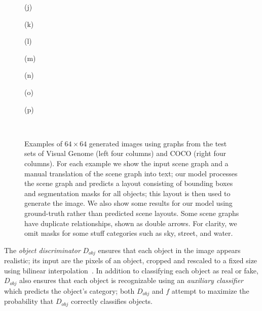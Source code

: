 \documentclass[10pt,twocolumn,letterpaper]{article}
\begin{document}
\begin{figure*}[ht!]
  \begin{minipage}{\qualsize} \centering\scriptsize (j) \end{minipage}
  \begin{minipage}{\qualsize} \centering\scriptsize (k) \end{minipage}
  \begin{minipage}{\qualsize} \centering\scriptsize (l) \end{minipage}
  \begin{minipage}{\qualsize} \centering\scriptsize (m) \end{minipage}
  \begin{minipage}{\qualsize} \centering\scriptsize (n) \end{minipage}
  \begin{minipage}{\qualsize} \centering\scriptsize (o) \end{minipage}
  \begin{minipage}{\qualsize} \centering\scriptsize (p) \end{minipage} \\

  \caption{
    Examples of $64\times64$ generated images using graphs from the test sets of
    Visual Genome (left four columns) and COCO (right four columns).
    For each example we show the input scene graph and a manual translation of the
    scene graph into text; our model processes the scene graph and predicts a layout
    consisting of bounding boxes and segmentation masks for all objects; this layout
    is then used to generate the image.
    We also show some results for our model using ground-truth rather than predicted scene layouts.
    Some scene graphs have duplicate relationships, shown as double arrows.
    For clarity, we omit masks for some stuff categories such as sky, street,
    and water.
  }
  \vspace{-4mm}
  \label{fig:qual}
\end{figure*}
 
The \emph{object discriminator} $D_{obj}$ ensures that each object in the image
appears realistic; its input are the pixels of an object, cropped and rescaled to
a fixed size using bilinear interpolation~\cite{jaderberg2015spatial}. In addition
to classifying each object as real or fake, $D_{obj}$ also ensures that each object
is recognizable using an \emph{auxiliary classifier}~\cite{odena2017conditional}
which predicts the object's category; both $D_{obj}$ and $f$ attempt to maximize
the probability that $D_{obj}$ correctly classifies objects.
\end{document}
